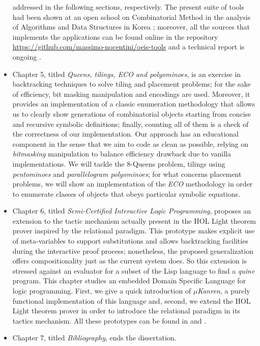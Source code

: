 \documentclass[a4paper, 10pt]{article}
\begin{document}
\begin{itemize}
addressed in the following sections, respectively.
The present suite of tools had been shown at an open school on Combinatorial
Method in the analysis of Algorithms and Data Structures in Korea
\citep{Nocentini:korea}; moreover, all the sources that implements the
applications can be found online in the repository
\url{https://github.com/massimo-nocentini/oeis-tools} and a technical report is
ongoing \citep{Merlini:Nocentini:oeis:technical:report}.
\item Chapter 5, titled \textit{Queens, tilings, ECO
and polyominoes}, is an exercise in
backtracking techniques to solve tiling and placement problems; for the sake of
efficiency, bit masking manipulation and encodings are used. Moreover, it
provides an implementation of a classic enumeration methodology that allows us
to clearly show generations of combinatorial objects starting from concise and
recursive symbolic definitions; finally, counting all of them is a check of
the correctness of our implementation.  
Our approach has an educational component in the sense that we aim to code as
clean as possible, relying on \textit{bitmasking} manipulation to balance
efficiency drawback due to vanilla implementations. We will tackle the
$8$-Queens problem, tilings using \textit{pentominoes} and
\textit{parallelogram polyominoes}; for what concerns placement problems, we
will show an implementation of the \textit{ECO} methodology in order to
enumerate classes of objects that obeys particular symbolic equations.
\item Chapter 6, titled \textit{Semi-Certified Interactive
Logic Programming}, proposes an extension to the tactic mechanism actually
present in the HOL Light theorem prover inspired by the relational paradigm.
This prototype makes explicit use of meta-variables to support substitutions
and allows backtracking facilities during the interactive proof process;
nonetheless, the proposed generalization offers compositionality just as the
current system does. So this extension is stressed against an evaluator for a
subset of the Lisp language to find a \textit{quine} program.  This chapter
studies an embedded Domain Specific Language for logic programming.  First, we
give a quick introduction of \textit{$\mu$Kanren}, a purely functional
implementation of this language and, second, we extend the HOL Light theorem
prover in order to introduce the relational paradigm in its tactics mechanism.
All these prototypes can be found in \citep{Nocentini:kanrens} and
\citep{Maggesi:Nocentini:kanrenlight}.
\item Chapter 7, titled \textit{Bibliography}, ends the dissertation. 
\end{itemize}
\end{document}
